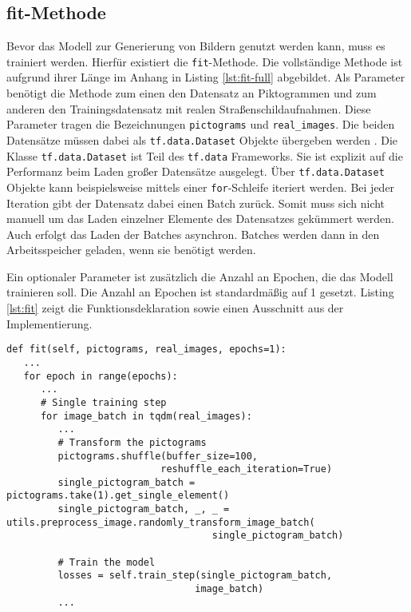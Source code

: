 \subsection{fit-Methode}
Bevor das Modell zur Generierung von Bildern genutzt werden kann, muss es trainiert werden. Hierfür existiert die \texttt{fit}-Methode. Die vollständige Methode ist aufgrund ihrer Länge im Anhang in Listing \ref{lst:fit-full} abgebildet. Als Parameter benötigt die Methode zum einen den Datensatz an Piktogrammen und zum anderen den Trainingsdatensatz mit realen Straßenschildaufnahmen. Diese Parameter tragen die Bezeichnungen \texttt{pictograms} und \texttt{real_images}. Die beiden Datensätze müssen dabei als \texttt{tf.data.Dataset} Objekte übergeben werden \cite{tf-dataset}. Die Klasse \texttt{tf.data.Dataset} ist Teil des \texttt{tf.data} Frameworks. Sie ist explizit auf die Performanz beim Laden großer Datensätze ausgelegt. Über \texttt{tf.data.Dataset} Objekte kann beispielsweise mittels einer \texttt{for}-Schleife iteriert werden. Bei jeder Iteration gibt der Datensatz dabei einen Batch zurück. Somit muss sich nicht manuell um das Laden einzelner Elemente des Datensatzes gekümmert werden. Auch erfolgt das Laden der Batches asynchron. Batches werden dann in den Arbeitsspeicher geladen, wenn sie benötigt werden. \cite{tf-dataset} 

Ein optionaler Parameter ist zusätzlich die Anzahl an Epochen, die das Modell trainieren soll. Die Anzahl an Epochen ist standardmäßig auf 1 gesetzt. Listing \ref{lst:fit} zeigt die Funktionsdeklaration sowie einen Ausschnitt aus der Implementierung.

\begin{code}
   \begin{verbatim}
def fit(self, pictograms, real_images, epochs=1):
   ...
   for epoch in range(epochs):
      ...
      # Single training step
      for image_batch in tqdm(real_images):
         ...
         # Transform the pictograms
         pictograms.shuffle(buffer_size=100, 
                           reshuffle_each_iteration=True)
         single_pictogram_batch = pictograms.take(1).get_single_element()
         single_pictogram_batch, _, _ = utils.preprocess_image.randomly_transform_image_batch(
                                    single_pictogram_batch)

         # Train the model
         losses = self.train_step(single_pictogram_batch, 
                                 image_batch)
         ...
   \end{verbatim}
   \label{lst:fit}
\end{code}

